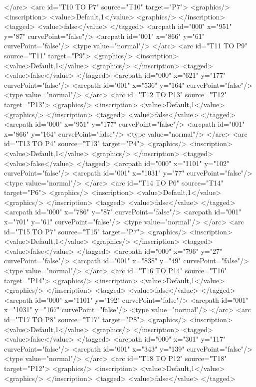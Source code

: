 </arc>
<arc id="T10 TO P7" source="T10" target="P7">
<graphics/>
<inscription>
<value>Default,1</value>
<graphics/>
</inscription>
<tagged>
<value>false</value>
</tagged>
<arcpath id="000" x="951" y="87" curvePoint="false"/>
<arcpath id="001" x="866" y="61" curvePoint="false"/>
<type value="normal"/>
</arc>
<arc id="T11 TO P9" source="T11" target="P9">
<graphics/>
<inscription>
<value>Default,1</value>
<graphics/>
</inscription>
<tagged>
<value>false</value>
</tagged>
<arcpath id="000" x="621" y="177" curvePoint="false"/>
<arcpath id="001" x="536" y="164" curvePoint="false"/>
<type value="normal"/>
</arc>
<arc id="T12 TO P13" source="T12" target="P13">
<graphics/>
<inscription>
<value>Default,1</value>
<graphics/>
</inscription>
<tagged>
<value>false</value>
</tagged>
<arcpath id="000" x="951" y="177" curvePoint="false"/>
<arcpath id="001" x="866" y="164" curvePoint="false"/>
<type value="normal"/>
</arc>
<arc id="T13 TO P4" source="T13" target="P4">
<graphics/>
<inscription>
<value>Default,1</value>
<graphics/>
</inscription>
<tagged>
<value>false</value>
</tagged>
<arcpath id="000" x="1101" y="102" curvePoint="false"/>
<arcpath id="001" x="1031" y="77" curvePoint="false"/>
<type value="normal"/>
</arc>
<arc id="T14 TO P6" source="T14" target="P6">
<graphics/>
<inscription>
<value>Default,1</value>
<graphics/>
</inscription>
<tagged>
<value>false</value>
</tagged>
<arcpath id="000" x="786" y="87" curvePoint="false"/>
<arcpath id="001" x="701" y="61" curvePoint="false"/>
<type value="normal"/>
</arc>
<arc id="T15 TO P7" source="T15" target="P7">
<graphics/>
<inscription>
<value>Default,1</value>
<graphics/>
</inscription>
<tagged>
<value>false</value>
</tagged>
<arcpath id="000" x="796" y="27" curvePoint="false"/>
<arcpath id="001" x="838" y="49" curvePoint="false"/>
<type value="normal"/>
</arc>
<arc id="T16 TO P14" source="T16" target="P14">
<graphics/>
<inscription>
<value>Default,1</value>
<graphics/>
</inscription>
<tagged>
<value>false</value>
</tagged>
<arcpath id="000" x="1101" y="192" curvePoint="false"/>
<arcpath id="001" x="1031" y="167" curvePoint="false"/>
<type value="normal"/>
</arc>
<arc id="T17 TO P8" source="T17" target="P8">
<graphics/>
<inscription>
<value>Default,1</value>
<graphics/>
</inscription>
<tagged>
<value>false</value>
</tagged>
<arcpath id="000" x="301" y="117" curvePoint="false"/>
<arcpath id="001" x="343" y="139" curvePoint="false"/>
<type value="normal"/>
</arc>
<arc id="T18 TO P12" source="T18" target="P12">
<graphics/>
<inscription>
<value>Default,1</value>
<graphics/>
</inscription>
<tagged>
<value>false</value>
</tagged>
